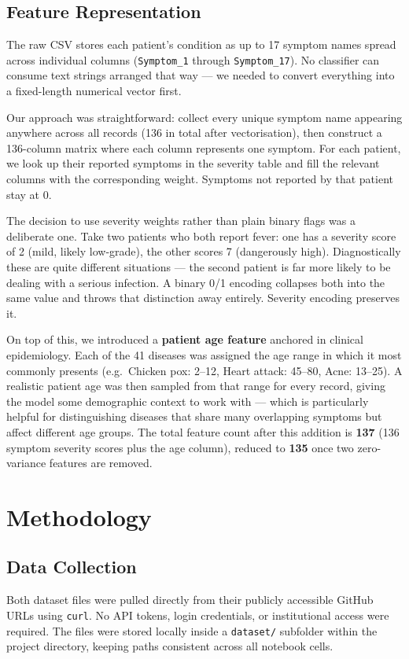 \documentclass[12pt,a4paper]{article}
\begin{document}
\subsection{Feature Representation}
The raw CSV stores each patient's condition as up to 17 symptom names spread across individual columns (\texttt{Symptom\_1} through \texttt{Symptom\_17}). No classifier can consume text strings arranged that way --- we needed to convert everything into a fixed-length numerical vector first.

Our approach was straightforward: collect every unique symptom name appearing anywhere across all records (136 in total after vectorisation), then construct a 136-column matrix where each column represents one symptom. For each patient, we look up their reported symptoms in the severity table and fill the relevant columns with the corresponding weight. Symptoms not reported by that patient stay at 0.

The decision to use severity weights rather than plain binary flags was a deliberate one. Take two patients who both report fever: one has a severity score of 2 (mild, likely low-grade), the other scores 7 (dangerously high). Diagnostically these are quite different situations --- the second patient is far more likely to be dealing with a serious infection. A binary 0/1 encoding collapses both into the same value and throws that distinction away entirely. Severity encoding preserves it.

On top of this, we introduced a \textbf{patient age feature} anchored in clinical epidemiology. Each of the 41 diseases was assigned the age range in which it most commonly presents (e.g.\ Chicken pox: 2--12, Heart attack: 45--80, Acne: 13--25). A realistic patient age was then sampled from that range for every record, giving the model some demographic context to work with --- which is particularly helpful for distinguishing diseases that share many overlapping symptoms but affect different age groups. The total feature count after this addition is \textbf{137} (136 symptom severity scores plus the age column), reduced to \textbf{135} once two zero-variance features are removed.

\section{Methodology}

\subsection{Data Collection}
Both dataset files were pulled directly from their publicly accessible GitHub URLs using \texttt{curl}. No API tokens, login credentials, or institutional access were required. The files were stored locally inside a \texttt{dataset/} subfolder within the project directory, keeping paths consistent across all notebook cells.
\end{document}

